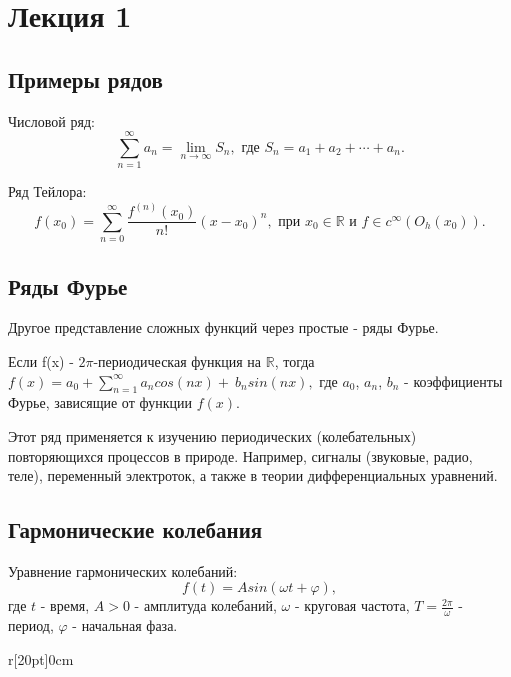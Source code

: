 \documentclass[a4paper, 12pt]{article}
\begin{document}
    \tableofcontents
    \clearpage
    \section{Лекция 1}
    \subsection{Примеры рядов}
    Числовой ряд:
    \begin{equation}
        \sum_{n=1}^{\infty} a_n = \lim_{n \to \infty} S_n, \text{ где } S_n = a_1 + a_2 + \cdots + a_n.
    \end{equation}

    Ряд Тейлора:
    \begin{equation}
        f(x_0) = \sum_{n=0}^{\infty} \frac{f^{(n)}(x_0)}{n!}(x-x_0)^n, \text{ при } x_0 \in \mathbb{R} \text{ и } f \in c^{\infty}(O_h(x_0)).
    \end{equation}

    \subsection{Ряды Фурье}
    Другое представление сложных функций через простые - ряды Фурье.

    Если f(x) - $2\pi$-периодическая функция на $\mathbb{R}$, тогда $f(x) = a_0 + \sum_{n=1}^{\infty} a_ncos(nx) +~b_nsin(nx),$ где $a_0$, $a_n$, $b_n$ - коэффициенты Фурье, зависящие от функции $f(x)$.

    Этот ряд применяется к изучению периодических (колебательных) повторяющихся процессов в природе. Например, сигналы (звуковые, радио, теле), переменный электроток, а также в теории дифференциальных уравнений.

    \subsection{Гармонические колебания}
    Уравнение гармонических колебаний:
    \begin{equation}\label{eq:garmonickoleb}
        f(t) = Asin(\omega t + \varphi),
    \end{equation}
    где $t$ - время, $A > 0$ - амплитуда колебаний, $\omega$ - круговая частота, $T = \frac{2\pi}{\omega}$ - период, $\varphi$ - начальная фаза.

    \setlength\intextsep{-9pt}
    \begin{wrapfigure}[6]{r}[20pt]{0cm}
    \end{wrapfigure}
\end{document}

